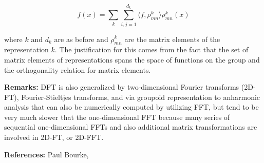 \documentclass[12pt]{article}
\begin{document}
  \[ f(x) = \sum_k \sum_{i,j = 1}^{d_k} \langle f, \rho^{k}_{mn} \rangle \rho^{k}_{mn} (x)  \]

where $k$ and $d_k$ are as before and $\rho^k_{mn}$ are the matrix elements of the representation $k$.  The justification for this comes from the fact that the set of matrix elements of representations spans the space of functions on the group and the orthogonality relation for matrix elements.

\textbf{Remarks:}
DFT is also generalized by two-dimensional Fourier transforms (2D-FT), Fourier-Stieltjes transforms, and via groupoid representation to anharmonic analysis that can also be numerically computed by utilizing FFT, but tend to
be very much slower that the one-dimensional FFT because many series of sequential one-dimensional FFTs and also additional matrix transformations are involved in 2D-FT, or 2D-FFT. 

{\bf References:}  
Paul Bourke, 

\end{document}
